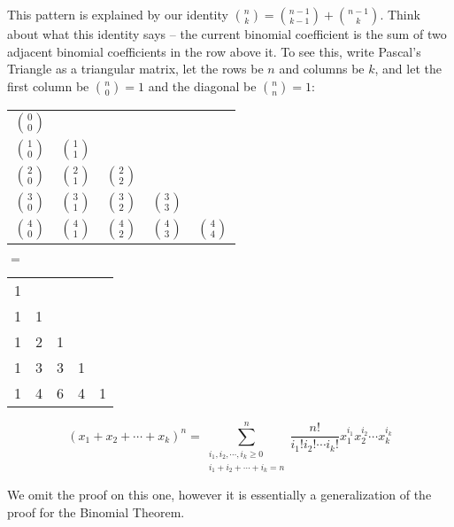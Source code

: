 \documentclass[main.tex]{subfiles}
\begin{document}
This pattern is explained by our identity \(\binom{n}{k} = \binom{n-1}{k-1} + \binom{n-1}{k}\). Think about what this identity says -- the current binomial coefficient is the sum of two adjacent binomial coefficients in the row above it. To see this, write Pascal's Triangle as a triangular matrix, let the rows be \(n\) and columns be \(k\), and let the first column be \(\binom{n}{0} = 1\) and the diagonal be \(\binom{n}{n} = 1\):
\begin{center}
	\bgroup
	\renewcommand{\arraystretch}{1.5}
	\begin{tabular}{ccccc}
		\(\binom{0}{0}\) & & & & \\
		\(\binom{1}{0}\) & \(\binom{1}{1}\) & & & \\
		\(\binom{2}{0}\) & \(\binom{2}{1}\) & \(\binom{2}{2}\) & & \\
		\(\binom{3}{0}\) & \(\binom{3}{1}\) & \(\binom{3}{2}\) & \(\binom{3}{3}\) & \\
		\(\binom{4}{0}\) & \(\binom{4}{1}\) & \(\binom{4}{2}\) & \(\binom{4}{3}\) & \(\binom{4}{4}\) \\
	\end{tabular}
	\hspace{0.5cm}
	\(=\)
	\hspace{0.5cm}
	\begin{tabular}{ccccc}
		1 & & & & \\
		1 & 1 & & & \\
		1 & 2 & 1 & & \\
		1 & 3 & 3 & 1 & \\
		1 & 4 & 6 & 4 & 1 \\
	\end{tabular}
	\egroup
\end{center}

\begin{thm}
	\[(x_1+x_2+\cdots+x_k)^n = \sum_{\substack{i_1, i_2, \cdots, i_k \geq 0 \\ i_1 + i_2 + \cdots + i_k = n}}^{n} \frac{n!}{i_1! i_2! \cdots i_k!} x_1^{i_1} x_2^{i_2} \cdots x_k^{i_k}\]
\end{thm}

We omit the proof on this one, however it is essentially a generalization of the proof for the Binomial Theorem.

\end{document}
